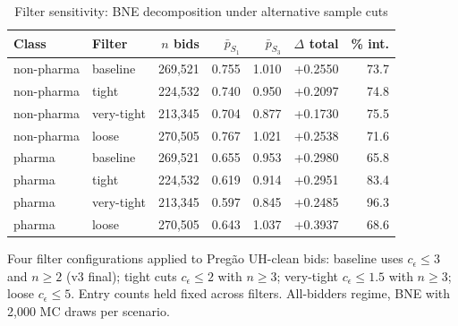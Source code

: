 \begin{table}[htbp]
\centering
\begin{threeparttable}
\caption{Filter sensitivity: BNE decomposition under alternative sample cuts}
\label{tab:v3_filter_sensitivity}
\small
\begin{tabular}{llrrrrr}
\toprule
Class & Filter & $n$ bids & $\bar p_{S_1}$ & $\bar p_{S_3}$ & $\Delta$ total & \% int. \\
\midrule
non-pharma & baseline & 269,521 & 0.755 & 1.010 & +0.2550 & 73.7 \\
non-pharma & tight & 224,532 & 0.740 & 0.950 & +0.2097 & 74.8 \\
non-pharma & very-tight & 213,345 & 0.704 & 0.877 & +0.1730 & 75.5 \\
non-pharma & loose & 270,505 & 0.767 & 1.021 & +0.2538 & 71.6 \\
pharma & baseline & 269,521 & 0.655 & 0.953 & +0.2980 & 65.8 \\
pharma & tight & 224,532 & 0.619 & 0.914 & +0.2951 & 83.4 \\
pharma & very-tight & 213,345 & 0.597 & 0.845 & +0.2485 & 96.3 \\
pharma & loose & 270,505 & 0.643 & 1.037 & +0.3937 & 68.6 \\
\bottomrule
\end{tabular}
\begin{tablenotes}\footnotesize
\item Four filter configurations applied to Preg\~ao UH-clean
bids: baseline uses $c_\epsilon \le 3$ and $n \ge 2$ (v3 final);
tight cuts $c_\epsilon \le 2$ with $n \ge 3$; very-tight
$c_\epsilon \le 1.5$ with $n \ge 3$; loose $c_\epsilon \le 5$.
Entry counts held fixed across filters. All-bidders regime, BNE
with 2{,}000 MC draws per scenario.
\end{tablenotes}
\end{threeparttable}
\end{table}
